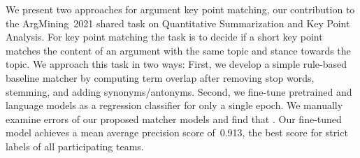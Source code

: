 We present two approaches for argument key point matching, our contribution to the ArgMining~2021 shared task on Quantitative Summarization and Key Point Analysis.
For key point matching the task is to decide if a short key point matches the content of an argument with the same topic and stance towards the topic.
We approach this task in two ways:
First, we develop a simple rule-based baseline matcher by computing term overlap after removing stop words, stemming, and adding synonyms/antonyms.
Second, we fine-tune pretrained \Bert and \Roberta language models as a regression classifier for only a single epoch.
We manually examine errors of our proposed matcher models and find that .
Our fine-tuned \RobertaBase model achieves a mean average precision score of~0.913, the best score for strict labels of all participating teams.
